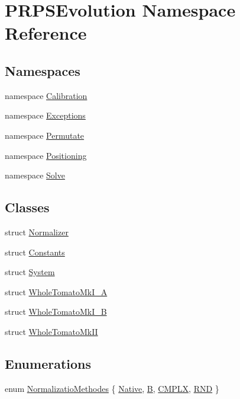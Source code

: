 \hypertarget{namespace_p_r_p_s_evolution}{\section{\-P\-R\-P\-S\-Evolution \-Namespace \-Reference}
\label{namespace_p_r_p_s_evolution}
}
\subsection*{\-Namespaces}
\begin{DoxyCompactItemize}
\item 
namespace \hyperlink{namespace_p_r_p_s_evolution_1_1_calibration}{\-Calibration}
\item 
namespace \hyperlink{namespace_p_r_p_s_evolution_1_1_exceptions}{\-Exceptions}
\item 
namespace \hyperlink{namespace_p_r_p_s_evolution_1_1_permutate}{\-Permutate}
\item 
namespace \hyperlink{namespace_p_r_p_s_evolution_1_1_positioning}{\-Positioning}
\item 
namespace \hyperlink{namespace_p_r_p_s_evolution_1_1_solve}{\-Solve}
\end{DoxyCompactItemize}
\subsection*{\-Classes}
\begin{DoxyCompactItemize}
\item 
struct \hyperlink{struct_p_r_p_s_evolution_1_1_normalizer}{\-Normalizer}
\item 
struct \hyperlink{struct_p_r_p_s_evolution_1_1_constants}{\-Constants}
\item 
struct \hyperlink{struct_p_r_p_s_evolution_1_1_system}{\-System}
\item 
struct \hyperlink{struct_p_r_p_s_evolution_1_1_whole_tomato_mk_i___a}{\-Whole\-Tomato\-Mk\-I\-\_\-\-A}
\item 
struct \hyperlink{struct_p_r_p_s_evolution_1_1_whole_tomato_mk_i___b}{\-Whole\-Tomato\-Mk\-I\-\_\-\-B}
\item 
struct \hyperlink{struct_p_r_p_s_evolution_1_1_whole_tomato_mk_i_i}{\-Whole\-Tomato\-Mk\-I\-I}
\end{DoxyCompactItemize}
\subsection*{\-Enumerations}
\begin{DoxyCompactItemize}
\item 
enum \hyperlink{namespace_p_r_p_s_evolution_aa0fb2fb2ee1d0aefb8d28fadadbf241a}{\-Normalizatio\-Methodes} \{ \hyperlink{namespace_p_r_p_s_evolution_aa0fb2fb2ee1d0aefb8d28fadadbf241aab94b9dbf476c301b4b796072a1ae576c}{\-Native}, 
\hyperlink{namespace_p_r_p_s_evolution_aa0fb2fb2ee1d0aefb8d28fadadbf241aa61bde7162502ef58228a8beee32deb20}{\-B}, 
\hyperlink{namespace_p_r_p_s_evolution_aa0fb2fb2ee1d0aefb8d28fadadbf241aa0145408cdc8045411ac6c7454431c38a}{\-C\-M\-P\-L\-X}, 
\hyperlink{namespace_p_r_p_s_evolution_aa0fb2fb2ee1d0aefb8d28fadadbf241aa16564c925c433030cc3c716769f95a98}{\-R\-N\-D}
 \}
\end{DoxyCompactItemize}
